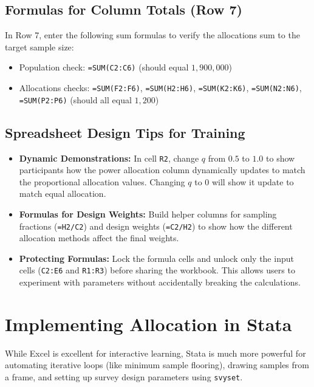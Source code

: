 \documentclass[11pt, a4paper]{article}
\begin{document}
\subsection{Formulas for Column Totals (Row 7)}
In Row 7, enter the following sum formulas to verify the allocations sum to the target sample size:
\begin{itemize}
    \item Population check: \verb|=SUM(C2:C6)| (should equal $1,900,000$)
    \item Allocations checks: \verb|=SUM(F2:F6)|, \verb|=SUM(H2:H6)|, \verb|=SUM(K2:K6)|, \verb|=SUM(N2:N6)|, \verb|=SUM(P2:P6)| (should all equal $1,200$)
\end{itemize}

\subsection{Spreadsheet Design Tips for Training}
\begin{itemize}
    \item \textbf{Dynamic Demonstrations:} In cell \texttt{R2}, change $q$ from $0.5$ to $1.0$ to show participants how the power allocation column dynamically updates to match the proportional allocation values. Changing $q$ to $0$ will show it update to match equal allocation.
    \item \textbf{Formulas for Design Weights:} Build helper columns for sampling fractions (\verb|=H2/C2|) and design weights (\verb|=C2/H2|) to show how the different allocation methods affect the final weights.
    \item \textbf{Protecting Formulas:} Lock the formula cells and unlock only the input cells (\texttt{C2:E6} and \texttt{R1:R3}) before sharing the workbook. This allows users to experiment with parameters without accidentally breaking the calculations.
\end{itemize}

\newpage

\section{Implementing Allocation in Stata}

While Excel is excellent for interactive learning, Stata is much more powerful for automating iterative loops (like minimum sample flooring), drawing samples from a frame, and setting up survey design parameters using \texttt{svyset}.
\end{document}
